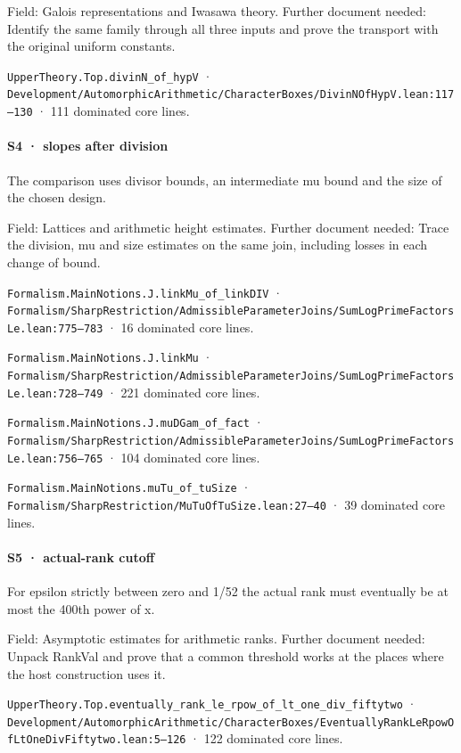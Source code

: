 Field: Galois representations and Iwasawa theory. Further document needed: Identify the same family through all three inputs and prove the transport with the original uniform constants.

\nolinkurl{UpperTheory.Top.divinN_of_hypV} · \nolinkurl{Development/AutomorphicArithmetic/CharacterBoxes/DivinNOfHypV.lean:117–130} · 111 dominated core lines.

\paragraph{S4 · slopes after division}

The comparison uses divisor bounds, an intermediate mu bound and the size of the chosen design.

Field: Lattices and arithmetic height estimates. Further document needed: Trace the division, mu and size estimates on the same join, including losses in each change of bound.

\nolinkurl{Formalism.MainNotions.J.linkMu_of_linkDIV} · \nolinkurl{Formalism/SharpRestriction/AdmissibleParameterJoins/SumLogPrimeFactorsLe.lean:775–783} · 16 dominated core lines.

\nolinkurl{Formalism.MainNotions.J.linkMu} · \nolinkurl{Formalism/SharpRestriction/AdmissibleParameterJoins/SumLogPrimeFactorsLe.lean:728–749} · 221 dominated core lines.

\nolinkurl{Formalism.MainNotions.J.muDGam_of_fact} · \nolinkurl{Formalism/SharpRestriction/AdmissibleParameterJoins/SumLogPrimeFactorsLe.lean:756–765} · 104 dominated core lines.

\nolinkurl{Formalism.MainNotions.muTu_of_tuSize} · \nolinkurl{Formalism/SharpRestriction/MuTuOfTuSize.lean:27–40} · 39 dominated core lines.

\paragraph{S5 · actual-rank cutoff}

For epsilon strictly between zero and 1/52 the actual rank must eventually be at most the 400th power of x.

Field: Asymptotic estimates for arithmetic ranks. Further document needed: Unpack RankVal and prove that a common threshold works at the places where the host construction uses it.

\nolinkurl{UpperTheory.Top.eventually_rank_le_rpow_of_lt_one_div_fiftytwo} · \nolinkurl{Development/AutomorphicArithmetic/CharacterBoxes/EventuallyRankLeRpowOfLtOneDivFiftytwo.lean:5–126} · 122 dominated core lines.

